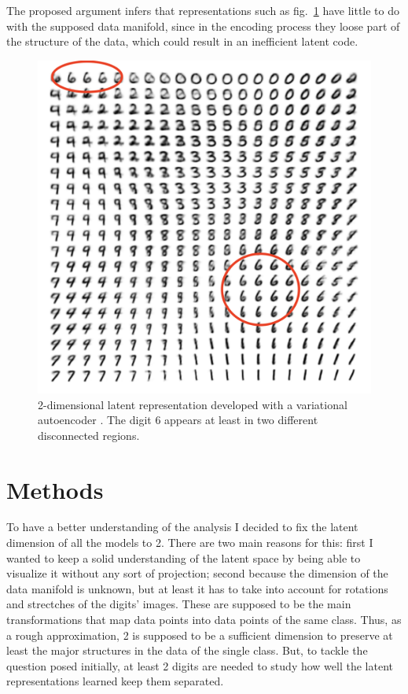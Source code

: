 \documentclass[twocolumn,gsifonts,twoside]{gsipaper}
\begin{document}
The proposed argument infers that representations such as fig.~\ref{fig:vae} have little to do with the supposed data manifold, since in the encoding process they loose part of the structure of the data, which could result in an inefficient latent code.

\begin{figure}
  \centering
  \includegraphics[width=.6\linewidth]{image_from_vae.png}
  \caption{2-dimensional latent representation developed with a variational autoencoder \cite{Kingma2022}. The digit 6 appears at least in two different disconnected regions.}
  \label{fig:vae}
\end{figure}


\section{Methods}
To have a better understanding of the analysis I decided to fix the latent dimension of all the models to 2. There are two main reasons for this: first I wanted to keep a solid understanding of the latent space by being able to visualize it without any sort of projection; second because the dimension of the data manifold is unknown, but at least it has to take into account for rotations and strectches of the digits' images. These are supposed to be the main transformations that map data points into data points of the same class. Thus, as a rough approximation, 2 is supposed to be a sufficient dimension to preserve at least the major structures in the data of the single class. But, to tackle the question posed initially, at least 2 digits are needed to study how well the latent representations learned keep them separated.
\end{document}
